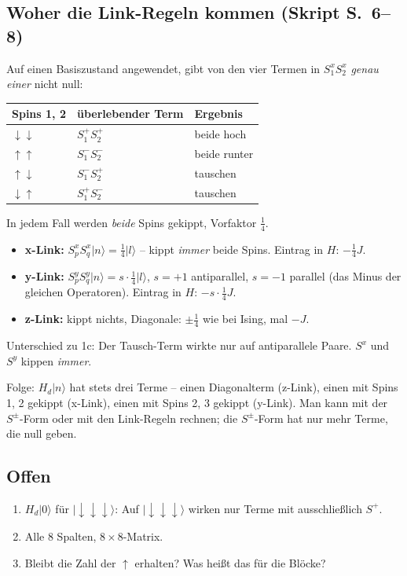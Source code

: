 \documentclass[11pt,a4paper]{article}
\newcommand{\ket}[1]{\lvert #1\rangle}
\newcommand{\up}{{\uparrow}}
\newcommand{\dn}{{\downarrow}}
\begin{document}
\subsection{Woher die Link-Regeln kommen (Skript S.~6--8)}

Auf einen Basiszustand angewendet, gibt von den vier Termen in $S^x_1S^x_2$ \emph{genau einer} nicht null:
\begin{center}
\begin{tabular}{@{}lll@{}}
\toprule
Spins 1, 2 & überlebender Term & Ergebnis\\
\midrule
$\dn\dn$ & $S^+_1S^+_2$ & beide hoch\\
$\up\up$ & $S^-_1S^-_2$ & beide runter\\
$\up\dn$ & $S^-_1S^+_2$ & tauschen\\
$\dn\up$ & $S^+_1S^-_2$ & tauschen\\
\bottomrule
\end{tabular}
\end{center}
In jedem Fall werden \emph{beide} Spins gekippt, Vorfaktor $\tfrac14$.

\begin{merk}
\begin{itemize}[leftmargin=*,itemsep=2pt]
\item \textbf{x-Link:} $S^x_pS^x_q\ket n = \tfrac14\ket l$ -- kippt \emph{immer} beide Spins. Eintrag in $H$: $-\tfrac14J$.
\item \textbf{y-Link:} $S^y_pS^y_q\ket n = s\cdot\tfrac14\ket l$, $s=+1$ antiparallel, $s=-1$ parallel (das Minus der gleichen Operatoren). Eintrag in $H$: $-s\cdot\tfrac14J$.
\item \textbf{z-Link:} kippt nichts, Diagonale: $\pm\tfrac14$ wie bei Ising, mal $-J$.
\end{itemize}
Unterschied zu 1c: Der Tausch-Term wirkte nur auf antiparallele Paare. $S^x$ und $S^y$ kippen \emph{immer}.
\end{merk}

Folge: $H_d\ket n$ hat stets drei Terme -- einen Diagonalterm (z-Link), einen mit Spins 1, 2 gekippt (x-Link), einen mit Spins 2, 3 gekippt (y-Link). Man kann mit der $S^\pm$-Form oder mit den Link-Regeln rechnen; die $S^\pm$-Form hat nur mehr Terme, die null geben.

\subsection{Offen}
\begin{enumerate}[itemsep=1pt]
\item $H_d\ket0$ für $\ket{\dn\dn\dn}$: Auf $\ket{\dn\dn\dn}$ wirken nur Terme mit ausschließlich $S^+$.
\item Alle 8 Spalten, $8\times8$-Matrix.
\item Bleibt die Zahl der $\up$ erhalten? Was heißt das für die Blöcke?
\end{enumerate}
\end{document}
